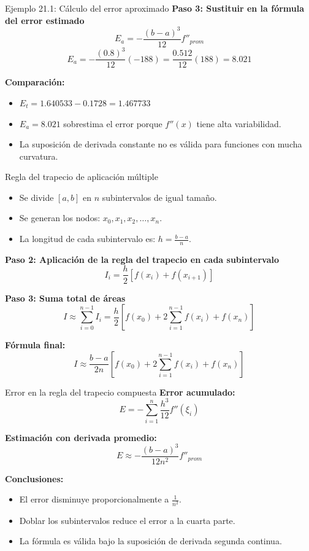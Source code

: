 \documentclass[main.tex]{subfiles}
\begin{document}
\begin{frame}{Ejemplo 21.1: Cálculo del error aproximado}
\textbf{Paso 3: Sustituir en la fórmula del error estimado}
\[ E_a = -\frac{(b - a)^3}{12} f''_{prom} \]
\[ E_a = -\frac{(0.8)^3}{12} (-188) = \frac{0.512}{12} (188) = 8.021 \]

\textbf{Comparación:}
\begin{itemize}
  \item \( E_t = 1.640533 - 0.1728 = 1.467733 \)
  \item \( E_a = 8.021 \) sobrestima el error porque \( f''(x) \) tiene alta variabilidad.
  \item La suposición de derivada constante no es válida para funciones con mucha curvatura.
\end{itemize}
\end{frame}



\begin{frame}{Regla del trapecio de aplicación múltiple}
\begin{itemize}
  \item Se divide \([a, b]\) en \(n\) subintervalos de igual tamaño.
  \item Se generan los nodos: \(x_0, x_1, x_2, \ldots, x_n\).
  \item La longitud de cada subintervalo es: \( h = \frac{b - a}{n} \).
\end{itemize}

\textbf{Paso 2: Aplicación de la regla del trapecio en cada subintervalo}
\[ I_i = \frac{h}{2} \left[ f(x_i) + f(x_{i+1}) \right] \]

\textbf{Paso 3: Suma total de áreas}
\[ I \approx \sum_{i=0}^{n-1} I_i = \frac{h}{2} \left[ f(x_0) + 2\sum_{i=1}^{n-1} f(x_i) + f(x_n) \right] \]

\textbf{Fórmula final:}
\[ I \approx \frac{b - a}{2n} \left[ f(x_0) + 2\sum_{i=1}^{n-1} f(x_i) + f(x_n) \right] \]
\end{frame}

\begin{frame}{Error en la regla del trapecio compuesta}
\textbf{Error acumulado:}
\[ E = -\sum_{i=1}^n \frac{h^3}{12} f''(\xi_i) \]

\textbf{Estimación con derivada promedio:}
\[ E \approx -\frac{(b - a)^3}{12n^2} f''_{prom} \]

\textbf{Conclusiones:}
\begin{itemize}
  \item El error disminuye proporcionalmente a \( \frac{1}{n^2} \).
  \item Doblar los subintervalos reduce el error a la cuarta parte.
  \item La fórmula es válida bajo la suposición de derivada segunda continua.
\end{itemize}
\end{frame}
\end{document}

